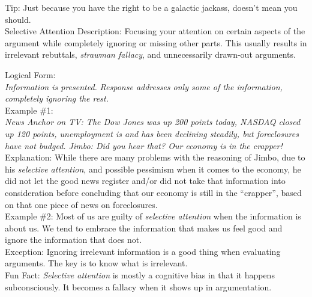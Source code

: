 \documentclass[a4paper,12pt,single,pdftex]{scrbook}
\begin{document}
    
      Tip: Just because you have the right to be a galactic jackass, doesn’t mean you should.
    \\

  

Selective Attention
    Description: Focusing your attention on certain aspects of the argument while completely ignoring or missing other parts.  This usually results in irrelevant rebuttals, {\it strawman fallacy}, and unnecessarily drawn-out arguments.

    
      Logical Form:
    \\

    
      {\em Information is presented.} \newline
{\em Response addresses only some of the information, completely ignoring the rest.}
    \\

    
      Example \#1:
    \\

    
      {\em News Anchor on TV: The Dow Jones was up 200 points today, NASDAQ closed up 120 points, unemployment is and has been declining steadily, but foreclosures have not budged. \newline
Jimbo: Did you hear that?  Our economy is in the crapper!}
    \\

    
      Explanation: While there are many problems with the reasoning of Jimbo, due to his {\it selective attention}, and possible pessimism when it comes to the economy, he did not let the good news register and/or did not take that information into consideration before concluding that our economy is still in the “crapper”, based on that one piece of news on foreclosures.
    \\

    
      Example \#2: Most of us are guilty of {\it selective attention}  when the information is about us.  We tend to embrace the information that makes us feel good and ignore the information that does not.
    \\

    
      Exception: Ignoring irrelevant information is a good thing when evaluating arguments.  The key is to know what is irrelevant.
    \\

    
      Fun Fact: {\em Selective attention} is mostly a cognitive bias in that it happens subconsciously. It becomes a fallacy when it shows up in argumentation.
    \\
\end{document}
